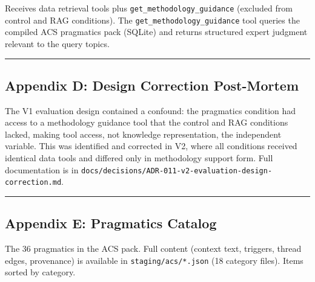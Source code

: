 \documentclass[
  11pt,
  letterpaper,
]{article}
\begin{document}
Receives data retrieval tools plus \texttt{get\_methodology\_guidance}
(excluded from control and RAG conditions). The
\texttt{get\_methodology\_guidance} tool queries the compiled ACS
pragmatics pack (SQLite) and returns structured expert judgment relevant
to the query topics.

\begin{center}\rule{0.5\linewidth}{0.5pt}\end{center}

\subsection{Appendix D: Design Correction
Post-Mortem}\label{appendix-d-design-correction-post-mortem}

The V1 evaluation design contained a confound: the pragmatics condition
had access to a methodology guidance tool that the control and RAG
conditions lacked, making tool access, not knowledge representation, the
independent variable. This was identified and corrected in V2, where all
conditions received identical data tools and differed only in
methodology support form. Full documentation is in
\texttt{docs/decisions/ADR-011-v2-evaluation-design-correction.md}.

\begin{center}\rule{0.5\linewidth}{0.5pt}\end{center}

\subsection{Appendix E: Pragmatics
Catalog}\label{appendix-e-pragmatics-catalog}

The 36 pragmatics in the ACS pack. Full content (context text, triggers,
thread edges, provenance) is available in \texttt{staging/acs/*.json}
(18 category files). Items sorted by category.
\end{document}
